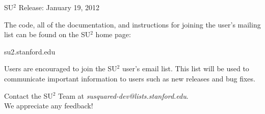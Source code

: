 \documentclass[handout,table]{beamer}
\begin{document}
{ 
  \logo{ }
  \begin{frame}

\begin{center}
   
  {\huge SU$^2$ Release: January 19, 2012 }
  
  \vspace{0.3in}
  
   The code, all of the documentation, and instructions for joining the user's mailing list can be found on the SU$^2$ home page:

  \vspace{0.3in}
  
{ \huge su2.stanford.edu }

   \vspace{0.3in}
   
Users are encouraged to join the SU$^2$ user's email list. This list will be used to communicate important information to users such as new releases and bug fixes.

   \vspace{0.3in}

   Contact the SU$^2$ Team at {\it susquared-dev@lists.stanford.edu}. \\ We appreciate any feedback!  
   
   \end{center}
  \end{frame} 
  }
  
\end{document}
